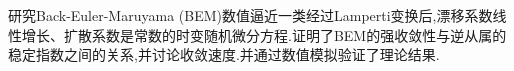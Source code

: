 

\begin{cnabstract}

研究Back-Euler-Maruyama (BEM)数值逼近一类经过Lamperti变换后,漂移系数线性增长、扩散系数是常数的时变随机微分方程.证明了BEM的强收敛性与逆从属的稳定指数之间的关系,并讨论收敛速度.并通过数值模拟验证了理论结果.



\end{cnabstract}

